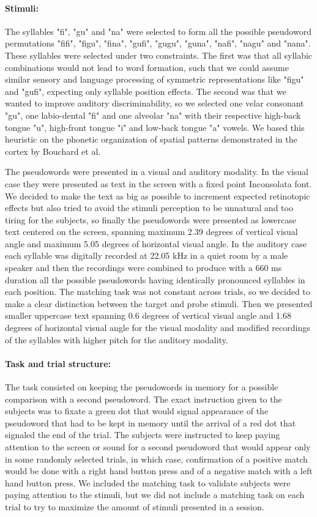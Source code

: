 \paragraph{Stimuli:}
The syllables "fi", "gu" and "na" were selected to form all the possible pseudoword permutations "fifi", "figu", "fina", "gufi", "gugu", "guna", "nafi", "nagu" and "nana".
These syllables were selected under two constraints.
The first was that all syllabic combinations would not lead to word formation, such that we could assume similar sensory and language processing of symmetric representations like "figu" and "gufi", expecting only syllable position effects.
The second was that we wanted to improve auditory discriminability, so we selected one velar consonant "gu", one labio-dental "fi" and one alveolar "na" with their respective high-back tongue "u", high-front tongue "i" and low-back tongue "a" vowels.
We based this heuristic on the phonetic organization of spatial patterns demonstrated in the cortex by Bouchard et al\citep{bouchard2013functional}.

The pseudowords were presented in a visual and auditory modality.
In the visual case they were presented as text in the screen with a fixed point Inconsolata font.
We decided to make the text as big as possible to increment expected retinotopic effects but also tried to avoid the stimuli perception to be unnatural and too tiring for the subjects, so finally the pseudowords were presented as lowercase text centered on the screen, spanning maximum 2.39 degrees of vertical visual angle and maximum 5.05 degrees of horizontal visual angle.
In the auditory case each syllable was digitally recorded at 22.05 kHz in a quiet room by a male speaker and then the recordings were combined to produce with a 660 ms duration all the possible pseudowords having identically pronounced syllables in each position.
The matching task was not constant across trials, so we decided to make a clear distinction between the target and probe stimuli.
Then we presented smaller uppercase text spanning 0.6 degrees of vertical visual angle and 1.68 degrees of horizontal visual angle for the visual modality and modified recordings of the syllables with higher pitch for the auditory modality.


\paragraph{Task and trial structure:}
The task consisted on keeping the pseudowords in memory for a possible comparison with a second pseudoword.
The exact instruction given to the subjects was to fixate a green dot that would signal appearance of the pseudoword that had to be kept in memory until the arrival of a red dot that signaled the end of the trial.
The subjects were instructed to keep paying attention to the screen or sound for a second pseudoword that would appear only in some randomly selected trials, in which case, confirmation of a positive match would be done with a right hand button press and of a negative match with a left hand button press.
We included the matching task to validate subjects were paying attention to the stimuli, but we did not include a matching task on each trial to try to maximize the amount of stimuli presented in a session.

